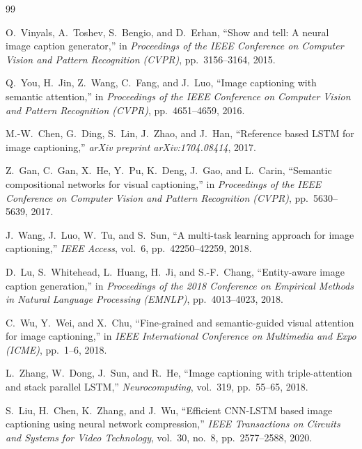 \documentclass{article}
\begin{document}
\newpage
\begin{thebibliography}{99}

O.~Vinyals, A.~Toshev, S.~Bengio, and D.~Erhan,
\newblock ``Show and tell: A neural image caption generator,''
\newblock in \textit{Proceedings of the IEEE Conference on Computer Vision and Pattern Recognition (CVPR)}, pp.~3156--3164, 2015.

Q.~You, H.~Jin, Z.~Wang, C.~Fang, and J.~Luo,
\newblock ``Image captioning with semantic attention,''
\newblock in \textit{Proceedings of the IEEE Conference on Computer Vision and Pattern Recognition (CVPR)}, pp.~4651--4659, 2016.

M.-W.~Chen, G.~Ding, S.~Lin, J.~Zhao, and J.~Han,
\newblock ``Reference based {LSTM} for image captioning,''
\newblock \textit{arXiv preprint arXiv:1704.08414}, 2017.

Z.~Gan, C.~Gan, X.~He, Y.~Pu, K.~Deng, J.~Gao, and L.~Carin,
\newblock ``Semantic compositional networks for visual captioning,''
\newblock in \textit{Proceedings of the IEEE Conference on Computer Vision and Pattern Recognition (CVPR)}, pp.~5630--5639, 2017.

J.~Wang, J.~Luo, W.~Tu, and S.~Sun,
\newblock ``A multi-task learning approach for image captioning,''
\newblock \textit{IEEE Access}, vol.~6, pp.~42250--42259, 2018.

D.~Lu, S.~Whitehead, L.~Huang, H.~Ji, and S.-F.~Chang,
\newblock ``Entity-aware image caption generation,''
\newblock in \textit{Proceedings of the 2018 Conference on Empirical Methods in Natural Language Processing (EMNLP)}, pp.~4013--4023, 2018.

C.~Wu, Y.~Wei, and X.~Chu,
\newblock ``Fine-grained and semantic-guided visual attention for image captioning,''
\newblock in \textit{IEEE International Conference on Multimedia and Expo (ICME)}, pp.~1--6, 2018.

L.~Zhang, W.~Dong, J.~Sun, and R.~He,
\newblock ``Image captioning with triple-attention and stack parallel {LSTM},''
\newblock \textit{Neurocomputing}, vol.~319, pp.~55--65, 2018.

S.~Liu, H.~Chen, K.~Zhang, and J.~Wu,
\newblock ``Efficient {CNN-LSTM} based image captioning using neural network compression,''
\newblock \textit{IEEE Transactions on Circuits and Systems for Video Technology}, vol.~30, no.~8, pp.~2577--2588, 2020.


\end{thebibliography}
\end{document}
